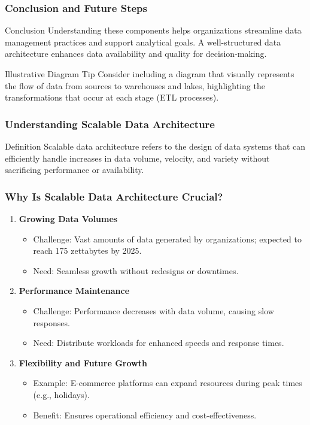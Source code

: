 \documentclass[aspectratio=169]{beamer}
\begin{document}
\begin{frame}[fragile]
    \frametitle{Conclusion and Future Steps}
    \begin{block}{Conclusion}
        Understanding these components helps organizations streamline data management practices and support analytical goals.
        A well-structured data architecture enhances data availability and quality for decision-making.
    \end{block}
    \begin{block}{Illustrative Diagram Tip}
        Consider including a diagram that visually represents the flow of data from sources to warehouses and lakes, 
        highlighting the transformations that occur at each stage (ETL processes).
    \end{block}
\end{frame}

\begin{frame}[fragile]
    \frametitle{Understanding Scalable Data Architecture}
    \begin{block}{Definition}
        Scalable data architecture refers to the design of data systems that can efficiently handle increases in data volume, velocity, and variety without sacrificing performance or availability.
    \end{block}
\end{frame}

\begin{frame}[fragile]
    \frametitle{Why Is Scalable Data Architecture Crucial?}
    \begin{enumerate}
        \item \textbf{Growing Data Volumes}
        \begin{itemize}
            \item Challenge: Vast amounts of data generated by organizations; expected to reach 175 zettabytes by 2025.
            \item Need: Seamless growth without redesigns or downtimes.
        \end{itemize}
        
        \item \textbf{Performance Maintenance}
        \begin{itemize}
            \item Challenge: Performance decreases with data volume, causing slow responses.
            \item Need: Distribute workloads for enhanced speeds and response times.
        \end{itemize}
        
        \item \textbf{Flexibility and Future Growth}
        \begin{itemize}
            \item Example: E-commerce platforms can expand resources during peak times (e.g., holidays).
            \item Benefit: Ensures operational efficiency and cost-effectiveness.
        \end{itemize}
    \end{enumerate}
\end{frame}
\end{document}
